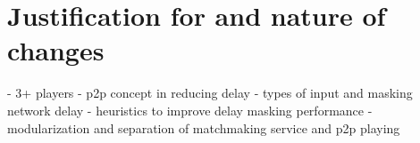 \documentclass{article}
\begin{document}
\clearpage


\section{Justification for and nature of changes}
% 
 - 3+ players
 - p2p concept in reducing delay
 - types of input and masking network delay
   - heuristics to improve delay masking performance
 - modularization and separation of matchmaking service and p2p playing



\clearpage
\end{document}
